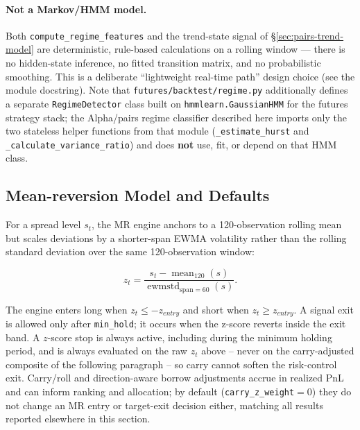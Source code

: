 \paragraph{Not a Markov/HMM model.} Both \texttt{compute\_regime\_features} and the
trend-state signal of \S\ref{sec:pairs-trend-model} are deterministic,
rule-based calculations on a rolling window --- there is no hidden-state inference, no
fitted transition matrix, and no probabilistic smoothing. This is a deliberate
``lightweight real-time path'' design choice (see the module docstring). Note that
\texttt{futures/backtest/regime.py} additionally defines a separate
\texttt{RegimeDetector} class built on \texttt{hmmlearn.GaussianHMM} for the futures
strategy stack; the Alpha/pairs regime classifier described here imports only the two
stateless helper functions from that module (\texttt{\_estimate\_hurst} and
\texttt{\_calculate\_variance\_ratio}) and does \textbf{not} use, fit, or depend on that
HMM class.

\subsection{Mean-reversion Model and Defaults}
\label{sec:pairs-mr-model}

For a spread level $s_t$, the MR engine anchors to a 120-observation rolling mean but
scales deviations by a shorter-span EWMA volatility rather than the rolling standard
deviation over the same 120-observation window:

\begin{equation}
z_t = \frac{s_t - \operatorname{mean}_{120}(s)}{\operatorname{ewmstd}_{\mathrm{span}=60}(s)}.
\end{equation}

The engine enters long when $z_t \le -z_{entry}$ and short when
$z_t \ge z_{entry}$. A signal exit is allowed only after \texttt{min\_hold}; it occurs
when the z-score reverts inside the exit band. A $z$-score stop is always active,
including during the minimum holding period, and is always evaluated on the raw
$z_t$ above -- never on the carry-adjusted composite of the following paragraph --
so carry cannot soften the risk-control exit. Carry/roll and direction-aware borrow
adjustments accrue in realized PnL and can inform ranking and allocation; by default
(\texttt{carry\_z\_weight}$=0$) they do not change an MR entry or target-exit decision
either, matching all results reported elsewhere in this section.

